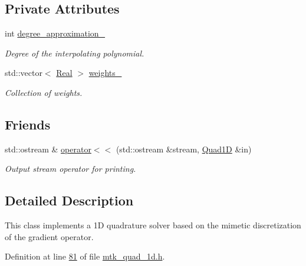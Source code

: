 \subsection*{Private Attributes}
\begin{DoxyCompactItemize}
\item 
int \hyperlink{classmtk_1_1Quad1D_aaff281c19f70faeb07f610fcffb300c5}{degree\+\_\+approximation\+\_\+}
\begin{DoxyCompactList}\small\item\em Degree of the interpolating polynomial. \end{DoxyCompactList}\item 
std\+::vector$<$ \hyperlink{group__c01-roots_gac080bbbf5cbb5502c9f00405f894857d}{Real} $>$ \hyperlink{classmtk_1_1Quad1D_abce6b19c2e089bc0691ef7623ec6d994}{weights\+\_\+}
\begin{DoxyCompactList}\small\item\em Collection of weights. \end{DoxyCompactList}\end{DoxyCompactItemize}
\subsection*{Friends}
\begin{DoxyCompactItemize}
\item 
std\+::ostream \& \hyperlink{classmtk_1_1Quad1D_af1194665f127e323852f778c8c0d4f95}{operator$<$$<$} (std\+::ostream \&stream, \hyperlink{classmtk_1_1Quad1D}{Quad1\+D} \&in)
\begin{DoxyCompactList}\small\item\em Output stream operator for printing. \end{DoxyCompactList}\end{DoxyCompactItemize}


\subsection{Detailed Description}
This class implements a 1\+D quadrature solver based on the mimetic discretization of the gradient operator. 

Definition at line \hyperlink{mtk__quad__1d_8h_source_l00081}{81} of file \hyperlink{mtk__quad__1d_8h_source}{mtk\+\_\+quad\+\_\+1d.\+h}.



